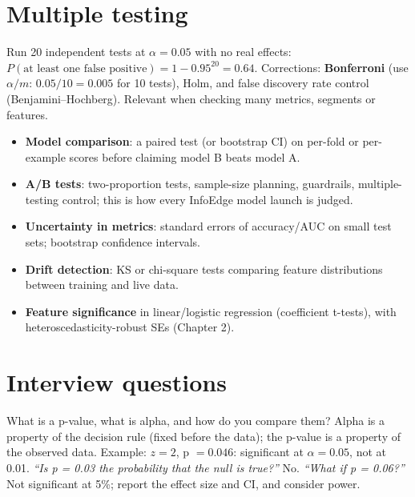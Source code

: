 \section{Multiple testing}
Run 20 independent tests at $\alpha = 0.05$ with no real effects: $P(\text{at least one false positive}) = 1 - 0.95^{20} = 0.64$. Corrections: \textbf{Bonferroni} (use $\alpha/m$:
$0.05/10 = 0.005$ for 10 tests), Holm, and false discovery rate control (Benjamini--Hochberg). Relevant when checking many metrics, segments or features.

\begin{practical}
\begin{itemize}
\item \textbf{Model comparison}: a paired test (or bootstrap CI) on per-fold or per-example scores before claiming model B beats model A.
\item \textbf{A/B tests}: two-proportion tests, sample-size planning, guardrails, multiple-testing control; this is how every InfoEdge model launch is judged.
\item \textbf{Uncertainty in metrics}: standard errors of accuracy/AUC on small test sets; bootstrap confidence intervals.
\item \textbf{Drift detection}: KS or chi-square tests comparing feature distributions between training and live data.
\item \textbf{Feature significance} in linear/logistic regression (coefficient t-tests), with heteroscedasticity-robust SEs (Chapter 2).
\end{itemize}
\end{practical}

\section{Interview questions}

\begin{qa}{ What is a p-value, what is alpha, and how do you compare them?}
\why Alpha is a property of the decision rule (fixed before the data); the p-value is a property of the observed data. Example: $z = 2$, p $= 0.046$: significant at $\alpha = 0.05$, not at 0.01.
\pushes \emph{``Is p = 0.03 the probability that the null is true?''} No. \emph{``What if p = 0.06?''} Not significant at 5\%; report the effect size and CI, and consider power.
\end{qa}

